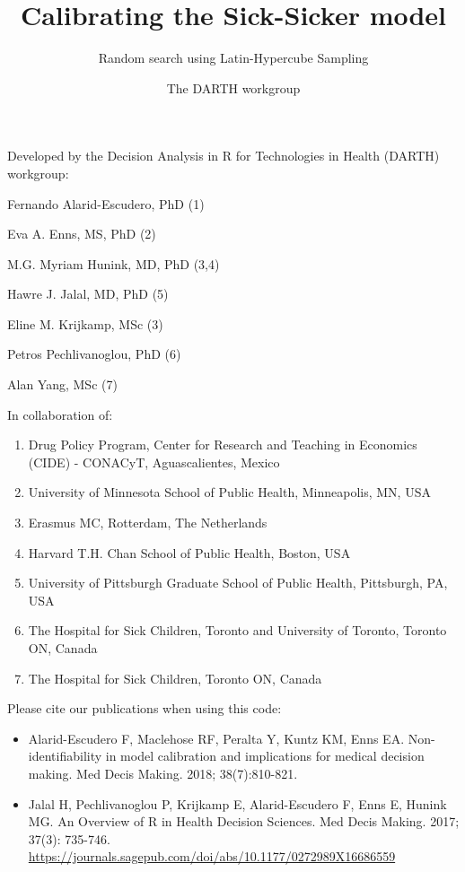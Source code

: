 \documentclass[
]{article}
\title{Calibrating the Sick-Sicker model}
\subtitle{Random search using Latin-Hypercube Sampling}
\author{The DARTH workgroup}
\date{}
\providecommand{\tightlist}{%
  \setlength{\itemsep}{0pt}\setlength{\parskip}{0pt}}
\begin{document}
\maketitle

Developed by the Decision Analysis in R for Technologies in Health
(DARTH) workgroup:

Fernando Alarid-Escudero, PhD (1)

Eva A. Enns, MS, PhD (2)

M.G. Myriam Hunink, MD, PhD (3,4)

Hawre J. Jalal, MD, PhD (5)

Eline M. Krijkamp, MSc (3)

Petros Pechlivanoglou, PhD (6)

Alan Yang, MSc (7)

In collaboration of:

\begin{enumerate}
\def\labelenumi{\arabic{enumi}.}
\tightlist
\item
  Drug Policy Program, Center for Research and Teaching in Economics
  (CIDE) - CONACyT, Aguascalientes, Mexico
\item
  University of Minnesota School of Public Health, Minneapolis, MN, USA
\item
  Erasmus MC, Rotterdam, The Netherlands
\item
  Harvard T.H. Chan School of Public Health, Boston, USA
\item
  University of Pittsburgh Graduate School of Public Health, Pittsburgh,
  PA, USA
\item
  The Hospital for Sick Children, Toronto and University of Toronto,
  Toronto ON, Canada
\item
  The Hospital for Sick Children, Toronto ON, Canada
\end{enumerate}

Please cite our publications when using this code:

\begin{itemize}
\item
  Alarid-Escudero F, Maclehose RF, Peralta Y, Kuntz KM, Enns EA.
  Non-identifiability in model calibration and implications for medical
  decision making. Med Decis Making. 2018; 38(7):810-821.
\item
  Jalal H, Pechlivanoglou P, Krijkamp E, Alarid-Escudero F, Enns E,
  Hunink MG. An Overview of R in Health Decision Sciences. Med Decis
  Making. 2017; 37(3): 735-746.
  \url{https://journals.sagepub.com/doi/abs/10.1177/0272989X16686559}
\end{itemize}
\end{document}
